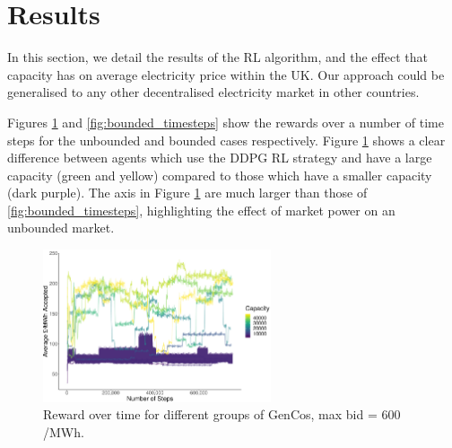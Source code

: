 






\section{Results}
\label{rl:sec:results}

In this section, we detail the results of the RL algorithm, and the effect that capacity has on average electricity price within the UK. Our approach could be generalised to any other decentralised electricity market in other countries. 

Figures \ref{fig:unbounded_timesteps} and \ref{fig:bounded_timesteps} show the rewards over a number of time steps for the unbounded and bounded cases respectively. Figure \ref{fig:unbounded_timesteps} shows a clear difference between agents which use the DDPG RL strategy and have a large capacity (green and yellow) compared to those which have a smaller capacity (dark purple). The axis in Figure \ref{fig:unbounded_timesteps} are much larger than those of \ref{fig:bounded_timesteps}, highlighting the effect of market power on an unbounded market.


\begin{figure}
	\centering
	\includegraphics[width=0.6\textwidth]{Chapter7/Figures/results/unbounded_results.pdf}
	\caption{Reward over time for different groups of GenCos, max bid = \textsterling $600$/MWh.}
	\label{fig:unbounded_timesteps}
\end{figure}

